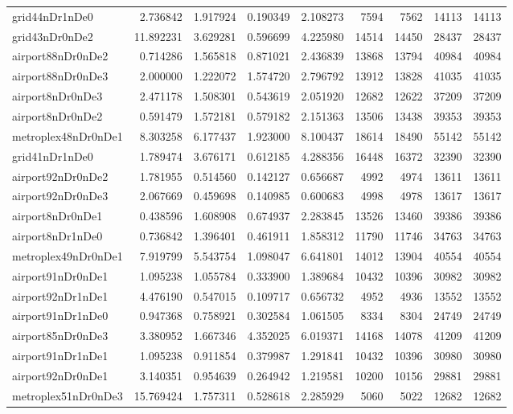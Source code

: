 \begin{longtable}{|l|r|r|r|r|r|r|r|r|}
grid44nDr1nDe0 & 2.736842 & 1.917924 & 0.190349 & 2.108273 & 7594 & 7562 & 14113 & 14113 \\
grid43nDr0nDe2 & 11.892231 & 3.629281 & 0.596699 & 4.225980 & 14514 & 14450 & 28437 & 28437 \\
airport88nDr0nDe2 & 0.714286 & 1.565818 & 0.871021 & 2.436839 & 13868 & 13794 & 40984 & 40984 \\
airport88nDr0nDe3 & 2.000000 & 1.222072 & 1.574720 & 2.796792 & 13912 & 13828 & 41035 & 41035 \\
airport8nDr0nDe3 & 2.471178 & 1.508301 & 0.543619 & 2.051920 & 12682 & 12622 & 37209 & 37209 \\
airport8nDr0nDe2 & 0.591479 & 1.572181 & 0.579182 & 2.151363 & 13506 & 13438 & 39353 & 39353 \\
metroplex48nDr0nDe1 & 8.303258 & 6.177437 & 1.923000 & 8.100437 & 18614 & 18490 & 55142 & 55142 \\
grid41nDr1nDe0 & 1.789474 & 3.676171 & 0.612185 & 4.288356 & 16448 & 16372 & 32390 & 32390 \\
airport92nDr0nDe2 & 1.781955 & 0.514560 & 0.142127 & 0.656687 & 4992 & 4974 & 13611 & 13611 \\
airport92nDr0nDe3 & 2.067669 & 0.459698 & 0.140985 & 0.600683 & 4998 & 4978 & 13617 & 13617 \\
airport8nDr0nDe1 & 0.438596 & 1.608908 & 0.674937 & 2.283845 & 13526 & 13460 & 39386 & 39386 \\
airport8nDr1nDe0 & 0.736842 & 1.396401 & 0.461911 & 1.858312 & 11790 & 11746 & 34763 & 34763 \\
metroplex49nDr0nDe1 & 7.919799 & 5.543754 & 1.098047 & 6.641801 & 14012 & 13904 & 40554 & 40554 \\
airport91nDr0nDe1 & 1.095238 & 1.055784 & 0.333900 & 1.389684 & 10432 & 10396 & 30982 & 30982 \\
airport92nDr1nDe1 & 4.476190 & 0.547015 & 0.109717 & 0.656732 & 4952 & 4936 & 13552 & 13552 \\
airport91nDr1nDe0 & 0.947368 & 0.758921 & 0.302584 & 1.061505 & 8334 & 8304 & 24749 & 24749 \\
airport85nDr0nDe3 & 3.380952 & 1.667346 & 4.352025 & 6.019371 & 14168 & 14078 & 41209 & 41209 \\
airport91nDr1nDe1 & 1.095238 & 0.911854 & 0.379987 & 1.291841 & 10432 & 10396 & 30980 & 30980 \\
airport92nDr0nDe1 & 3.140351 & 0.954639 & 0.264942 & 1.219581 & 10200 & 10156 & 29881 & 29881 \\
metroplex51nDr0nDe3 & 15.769424 & 1.757311 & 0.528618 & 2.285929 & 5060 & 5022 & 12682 & 12682 \\

\end{longtable}
